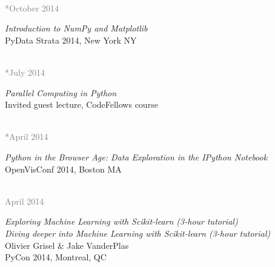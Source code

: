 \documentclass{article} %
\newlength\sidebarwidth
\newcommand{\dateonly}[2][]
	 {\begin{minipage}{\textwidth}
	 \vspace*{.4\baselineskip}
         \nopagebreak\hspace{0in}%
         \nopagebreak\begin{minipage}[t]{\sidebarwidth - .2cm}
         \raggedleft {~}
         {\\[-\baselineskip] \textcolor{gray}{\footnotesize #1}}
	 \end{minipage}%
	 \hfill
	 \begin{minipage}[t]{\linewidth - \sidebarwidth}
	 #2%
	 \end{minipage}%
	 \vspace*{.2\baselineskip plus 1\baselineskip minus
	 .2\baselineskip}%
	 \end{minipage}}
\begin{document}
  \dateonly[**October 2014]{
    {\it Introduction to NumPy and Matplotlib}\\
    PyData \@ Strata 2014, New York NY
  }

  \dateonly[**July 2014]{
    {\it Parallel Computing in Python}\\
    Invited guest lecture, CodeFellows course
  }

  \dateonly[**April 2014]{
    {\it Python in the Browser Age: Data Exploration in the IPython Notebook}\\
    OpenVisConf 2014, Boston MA
  }

  \dateonly[April 2014]{
    {\it Exploring Machine Learning with Scikit-learn (3-hour tutorial)}\\
    {\it Diving deeper into Machine Learning with Scikit-learn (3-hour tutorial)}\\
    Olivier Grisel \& Jake VanderPlas\\
    PyCon 2014, Montreal, QC
  }
\end{document}
